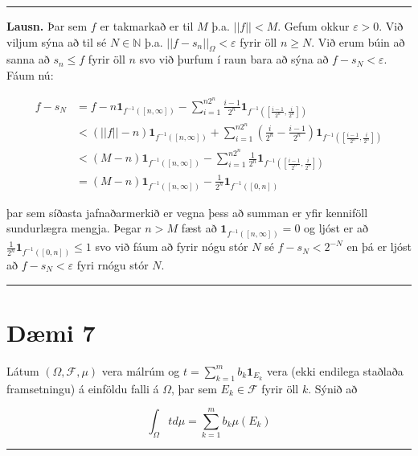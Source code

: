 \documentclass[]{book}
\begin{document}
\begin{center}\rule{0.5\linewidth}{\linethickness}\end{center}

\textbf{Lausn.} Þar sem \(f\) er takmarkað er til \(M\) þ.a. \(||f||<M\). Gefum okkur \(\varepsilon > 0\). Við viljum sýna að til sé \(N\in\mathbb N\) þ.a. \(||f-s_n||_\Omega < \varepsilon\) fyrir öll \(n\geq N\). Við erum búin að sanna að \(s_n \leq f\) fyrir öll \(n\) svo við þurfum í raun bara að sýna að \(f-s_N < \varepsilon\). Fáum nú:

\[
\begin{aligned}
f - s_N &= f - n\mathbf 1_{f^{-1}([n,\infty])} - \sum_{i=1}^{n2^n}\frac{i-1}{2^n}\mathbf1_{f^{-1}([\frac{i-1}{2^n}, \frac{i}{2^n}])} \\
&< (||f|| - n)\mathbf 1_{f^{-1}([n,\infty])} + \sum_{i=1}^{n2^n}(\frac{i}{2^n} - \frac{i-1}{2^n})\mathbf1_{f^{-1}([\frac{i-1}{2^n}, \frac{i}{2^n}])} \\
&< (M - n)\mathbf 1_{f^{-1}([n,\infty])} - \sum_{i=1}^{n2^n}\frac{1}{2^n}\mathbf1_{f^{-1}([\frac{i-1}{2^n}, \frac{i}{2^n}])} \\
&= (M - n)\mathbf 1_{f^{-1}([n,\infty])} - \frac{1}{2^n}\mathbf1_{f^{-1}([0,n])}
\end{aligned}
\]

þar sem síðasta jafnaðarmerkið er vegna þess að summan er yfir kenniföll sundurlægra mengja. Þegar \(n > M\) fæst að \(\mathbf 1_{f^{-1}([n,\infty])} = 0\) og ljóst er að \(\frac{1}{2^n}\mathbf1_{f^{-1}([0,n])}\leq1\) svo við fáum að fyrir nógu stór \(N\) sé \(f-s_N < 2^{-N}\) en þá er ljóst að \(f-s_N < \varepsilon\) fyri rnógu stór \(N\).

\begin{center}\rule{0.5\linewidth}{\linethickness}\end{center}

\hypertarget{dmi-7-3}{%
\section*{Dæmi 7}\label{dmi-7-3}}

Látum \((\Omega, \mathcal F, \mu)\) vera málrúm og \(t = \sum_{k=1}^mb_k\mathbf 1_{E_k}\) vera (ekki endilega staðlaða framsetningu) á einföldu falli á \(\Omega\), þar sem \(E_k \in \mathcal F\) fyrir öll \(k\). Sýnið að

\[
\int_\Omega t d\mu = \sum_{k=1}^m b_k\mu(E_k)
\]

\begin{center}\rule{0.5\linewidth}{\linethickness}\end{center}
\end{document}

